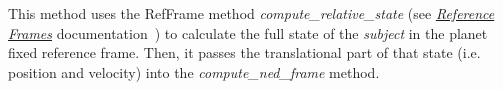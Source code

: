 \begin{itemize}
\begin{enumerate}
This method uses the RefFrame method \textit{compute\_relative\_state} (see \href{file:\JEODHOME/models/utils/ref\_frames/docs/ref\_frames.pdf}{\em Reference Frames} documentation~\cite{dynenv:REFFRAMES}) to calculate the full state of the \textit{subject} in the planet fixed reference frame.  Then, it passes the translational part of that state (i.e. position and velocity) into the \textit{compute\_ned\_frame} method.

\end{enumerate}
\end{itemize}
